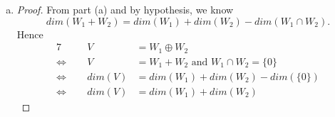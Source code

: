 \begin{Exercise}
\begin{enumerate}[(a)]
\begin{proof}
By hypothesis that $W_1,W_2$ are finite-dimensional vector spaces, we know $W_1\cap W_2$ is also finite-dimensional; hence we obtain $k+m,k+p,k<\infty$. From formula \eqref{eq:ex_1.6.29a3}, we conclude $W_1+W_2$ is also a finite-dimensional vector space since $k+m+p<\infty$.
\end{proof}

\item
\begin{proof}
From part (a) and by hypothesis, we know
$$
dim(W_1+W_2) = dim(W_1)+dim(W_2)-dim(W_1\cap W_2).
$$
Hence
\begin{alignat*}{7}
\quad&& V &= W_1\oplus W_2 \\
\iff&& V &= W_1+W_2\text{ and }W_1\cap W_2=\{0\} \\
\iff&& dim(V) &= dim(W_1)+dim(W_2)-dim(\{0\}) \\
\iff&& dim(V) &= dim(W_1)+dim(W_2)
\end{alignat*}
\end{proof}
\end{enumerate}
\end{Exercise}